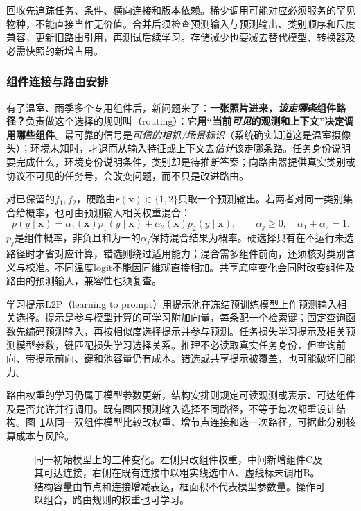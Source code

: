 回收先追踪任务、条件、横向连接和版本依赖。稀少调用可能对应必须服务的罕见物种，不能直接当作无价值。合并后须检查预测输入与预测输出、类别顺序和尺度兼容，更新旧路由引用，再测试后续学习。存储减少也要减去替代模型、转换器及必需快照的新增占用。

\subsubsection{组件连接与路由安排}
\label{sec:ket-update-routing}

有了温室、雨季多个专用组件后，新问题来了：\textbf{一张照片进来，\emph{该走哪条}组件路径？}负责做这个选择的规则叫（routing）：它\textbf{用“当前\emph{可见}的观测和上下文”决定调用哪些组件}。最可靠的信号是\emph{可信的相机/场景标识}（系统确实知道这是温室摄像头）；环境未知时，才退而从输入特征或上下文去\emph{估计}该走哪条路。任务身份说明要完成什么，环境身份说明条件，类别却是待推断答案；向路由器提供真实类别或协议不可见的任务号，会改变问题，而不只是改进路由。

对已保留的$f_1,f_2$，硬路由$r(\bm x)\in\{1,2\}$只取一个预测输出。若两者对同一类别集合给概率，也可由预测输入相关权重混合：
\[
p(y\mid\bm x)=
\alpha_1(\bm x)p_1(y\mid\bm x)
+\alpha_2(\bm x)p_2(y\mid\bm x),\qquad
\alpha_j\ge0,\quad\alpha_1+\alpha_2=1.
\]
$p_j$是组件概率，非负且和为一的$\alpha_j$保持混合结果为概率。硬选择只有在不运行未选路径时才省对应计算，错选则绕过适用能力；混合需多组件前向，还须核对类别含义与校准。不同温度logit不能因同维就直接相加。共享底座变化会同时改变组件及路由的预测输入，兼容性也须复查。

学习提示L2P（learning to prompt）用提示池在冻结预训练模型上作预测输入相关选择。提示是参与模型计算的可学习附加向量，每条配一个检索键；固定查询函数先编码预测输入，再按相似度选择提示并参与预测。任务损失学习提示及相关预测模型参数，键匹配损失学习选择关系。推理不必读取真实任务身份，但查询前向、带提示前向、键和池容量仍有成本。错选或共享提示被覆盖，也可能破坏旧能力。

路由权重的学习仍属于模型参数更新，结构安排则规定可读观测或表示、可达组件及是否允许并行调用。既有图因预测输入选择不同路径，不等于每次都重设计结构。图~\ref{fig:ket-update-operations}从同一双组件模型比较改权重、增节点连接和选一次路径，可据此分别核算成本与风险。

\begin{figure}[htbp]
\centering

\caption{同一初始模型上的三种变化。左侧只改组件权重，中间新增组件C及其可达连接，右侧在既有连接中以粗实线选中A、虚线标未调用B。结构容量由节点和连接增减表达，框面积不代表模型参数量。操作可以组合，路由规则的权重也可学习。}
\label{fig:ket-update-operations}
\end{figure}


